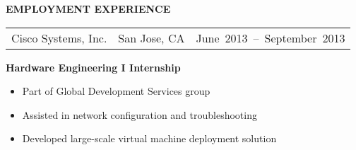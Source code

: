 \documentclass[12pt]{article}
\begin{document}
\textbf{EMPLOYMENT EXPERIENCE}
\begin{adjustwidth*}{3em}{0em}
  \vspace*{-3mm}
  \begin{tabularx}{\linewidth}{@{}XCR@{}}
    Cisco Systems, Inc. & San Jose, CA & \mbox{June 2013 -- September 2013}
  \end{tabularx}
  \textbf{Hardware Engineering I Internship}
  \vspace*{-3mm}
  \begin{itemize}
  \item Part of Global Development Services group
  \item Assisted in network configuration and troubleshooting
  \item Developed large-scale virtual machine deployment solution
  \end{itemize}
\end{adjustwidth*}

\vspace*{3mm}
\end{document}
